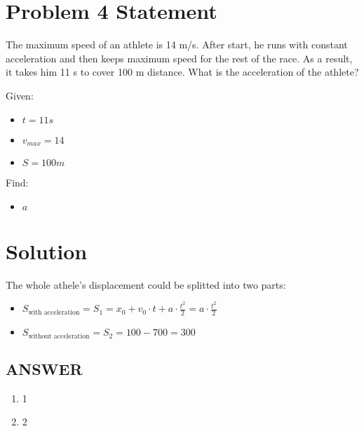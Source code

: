 \section*{Problem 4 Statement}

The maximum speed of an athlete is 14 m/s. After start, he runs with constant acceleration and
then keeps maximum speed for the rest of the race. As a result, it takes him 11 s to cover 100 m
distance. What is the acceleration of the athlete?

\bigbreak Given:

\begin{itemize}
    \item $t = 11s$
    \item $v_{max} = 14$
    \item $S = 100m$
\end{itemize}

\bigbreak Find:

\begin{itemize}
    \item $a$
\end{itemize}

\section*{Solution}

The whole athele's displacement could be splitted into two parts:

\begin{itemize}
    \item $S_{\text{with acceleration}} = S_1 = x_0 + v_0 \cdot t + a \cdot \frac{t^2}{2} = a \cdot \frac{t^2}{2}$
    \item $ S_{\text{without acceleration}} = S_2 = 100 - 700 = 300$
\end{itemize}

\vfill \subsection*{ANSWER}
\begin{enumerate}
    \item 1
    \item 2
\end{enumerate}
